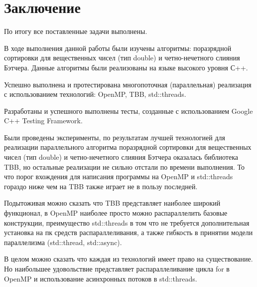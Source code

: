 \documentclass{article}
\begin{document}
\section{Заключение}
По итогу все поставленные задачи выполнены.

\par В ходе выполнения данной работы были изучены алгоритмы: поразрядной сортировки для вещественных чисел (тип double) и  четно-нечетного слияния Бэтчера. Данные алгоритмы были реализованы на языке высокого уровня С++.

\par Успешно выполнена и протестирована многопоточная (параллельная) реализация с использованием технологий: OpenMP, TBB, std::threads.

\par Разработаны и успешного выполнены тесты, созданные с использованием Google C++ Testing Framework.

\par Были проведены эксперименты, по результатам лучшей технологией для реализации параллельного алгоритма поразрядной сортировки для вещественных чисел (тип double) и  четно-нечетного слияния Бэтчера оказалась библиотека TBB, но остальные реализации не сильно отстали по времени выполнения. То что порог вхождения для написания программы на OpenMP и std::threads гораздо ниже чем на TBB также играет не в пользу последней.
\par Подытоживая можно сказать что TBB представляет наиболее широкий функционал, в OpenMP наиболее просто можно распараллелить базовые конструкции, преимущество std::threads в том что не требуется дополнительная установка на пк средств распараллеливания, а также гибкость в принятии модели параллелизма (std::thread, std::async).
\par В целом можно сказать что каждая из технологий имеет право на существование. Но наибольшее удовольствие представляет распараллеливание цикла for в OpenMP и использование асинхронных потоков в std::threads.

\newpage
\end{document}
